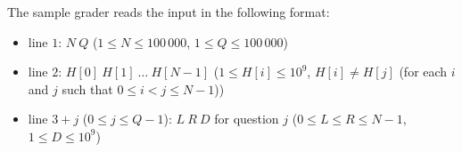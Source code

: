 The sample grader reads the input in the following format:
\begin{itemize}
    \item line $1$: $N \ Q$ ($1 \le N \le 100\,000$, $1 \le Q \le 100\,000$)
    \item line $2$: $H[0] \ H[1] \ \ldots \ H[N - 1]$ ($1 \le H[i] \le 10^9$, $H[i] \ne H[j]$ (for each $i$ and $j$ such that $0 \le i \lt j \le N - 1$))
    \item line $3 + j$ ($0 \le j \le Q - 1$): $L \ R \ D$ for question $j$ ($0 \le L \le R \le N - 1$, $1 \le D \le 10^9$)

\end{itemize}

